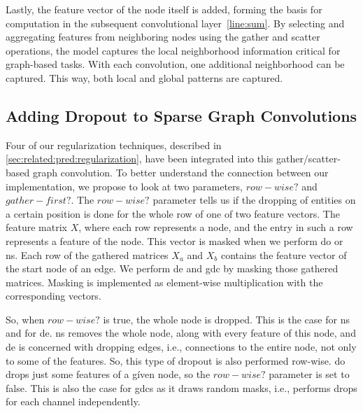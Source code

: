 Lastly, the feature vector of the node itself is added, forming the basis for computation in the subsequent convolutional layer~\cref{line:sum}.
By selecting and aggregating features from neighboring nodes using the gather and scatter operations, the model captures the local neighborhood information critical for graph-based tasks.
With each convolution, one additional neighborhood can be captured.
This way, both local and global patterns are captured.

\subsection{Adding Dropout to Sparse Graph Convolutions}
\label{sec:implement:gnndropout:dropout}
Four of our regularization techniques, described in \cref{sec:related:pred:regularization}, have been integrated into this gather/scatter-based graph convolution.
To better understand the connection between our implementation, we propose to look at two parameters, $\mathit{row-wise?}$ and $\mathit{gather-first?}$.
The $\mathit{row-wise?}$ parameter tells us if the dropping of entities on a certain position is done for the whole row of one of two feature vectors.
The feature matrix $X$, where each row represents a node, and the entry in such a row represents a feature of the node.
This vector is masked when we perform \ac{do} or \ac{ns}.
Each row of the gathered matrices $X_a$ and $X_b$ contains the feature vector of the start node of an edge.
We perform \ac{de} and \ac{gdc} by masking those gathered matrices.
Masking is implemented as element-wise multiplication with the corresponding vectors.

So, when $\mathit{row-wise?}$ is true, the whole node is dropped.
This is the case for \acf{ns} and for \acf{de}. \Ac{ns} removes the whole node, along with every feature of this node, and \ac{de} is concerned with dropping edges, i.e., connections to the entire node, not only to some of the features.
So, this type of dropout is also performed row-wise.
\Acf{do} drops just some features of a gíven node, so the $\mathit{row-wise?}$ parameter is set to false.
This is also the case for \acp{gdc} as it draws random masks, i.e., performs drops for each channel independently.

